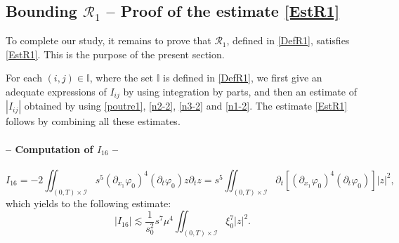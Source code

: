 \documentclass[a4paper, 12pt]{article}
\theoremstyle{plain}
\theoremstyle{definition}
\numberwithin{theorem}{section}
\numberwithin{equation}{section}
\begin{document}
{%
\subsection{Bounding \texorpdfstring{$\mathcal{R}_1$ -- Proof of the estimate \texorpdfstring{\eqref{EstR1}}{ref}}{reste}}\label{SectionEstR1}
To complete our study, it remains to  prove that $\mathcal{R}_1$, defined in \eqref{DefR1}, satisfies \eqref{EstR1}. This is the purpose of the present section.

For each $(i,j)\in \mathbb{I}$, where the set $\mathbb{I}$ is defined in \eqref{DefR1}, we first give an adequate expressions of $I_{ij}$ by using integration by parts, and then an estimate of $|I_{ij}|$ obtained by using  \eqref{poutre1}, \eqref{n2-2}, \eqref{n3-2} and \eqref{n1-2}. The estimate \eqref{EstR1} follows by combining all these estimates.
\paragraph{-- Computation of $I_{16}$ --}

$$
I_{16}=-2\iint_{(0,T)\times\mathcal{I}}s^5(\partial_{x_1}\varphi_0)^4(\partial_t\varphi_0)z\partial_tz=s^5\iint_{(0,T)\times\mathcal{I}}\partial_t[(\partial_{x_1}\varphi_0)^4(\partial_t\varphi_0)]|z|^2,
$$
which yields to the following estimate:
$$
|I_{16}|\lesssim \frac{1}{s_0^2}s^7\mu^4\iint_{(0,T)\times\mathcal{I}}\xi_0^{7}|z|^2.
$$
}
\end{document}
